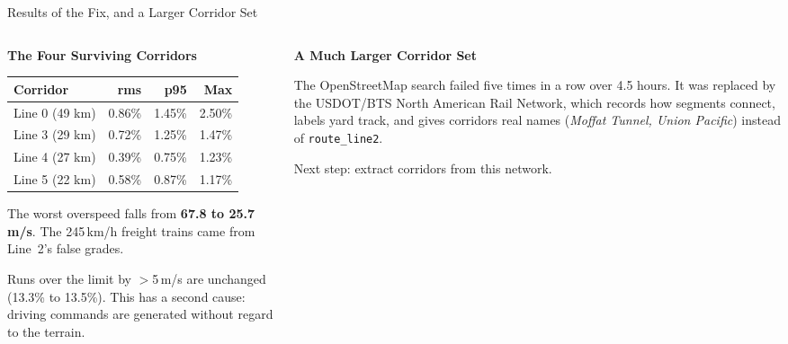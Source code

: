\begin{frame}{Results of the Fix, and a Larger Corridor Set}
  \vspace{0.2em}
  \begin{columns}[T,onlytextwidth]
    \begin{column}{0.46\textwidth}
      {\small\textbf{The Four Surviving Corridors}}
      \vspace{0.4em}

      {\footnotesize
      \begin{tabular}{@{}lrrr@{}}
        \toprule
        \textbf{Corridor} & \textbf{rms} & \textbf{p95} & \textbf{Max} \\
        \midrule
        Line 0 (49 km) & 0.86\% & 1.45\% & 2.50\% \\
        Line 3 (29 km) & 0.72\% & 1.25\% & 1.47\% \\
        Line 4 (27 km) & 0.39\% & 0.75\% & 1.23\% \\
        Line 5 (22 km) & 0.58\% & 0.87\% & 1.17\% \\
        \bottomrule
      \end{tabular}}

      \vspace{0.7em}
      {\footnotesize
      The worst overspeed falls from \textbf{67.8 to 25.7\,m/s}. The 245\,km/h
      freight trains came from Line~2's false grades.

      \vspace{0.4em}
      Runs over the limit by $>$5\,m/s are unchanged (13.3\% to 13.5\%).
      \alert{This has a second cause}: driving commands are generated
      without regard to the terrain.}
    \end{column}
    \begin{column}{0.50\textwidth}
      {\small\textbf{A Much Larger Corridor Set}}
      \vspace{0.5em}

      {\footnotesize The OpenStreetMap search failed five times in a row over
      4.5 hours. It was replaced by the USDOT/BTS North American Rail Network,
      which records how segments connect, labels yard track, and gives
      corridors real names (\emph{Moffat Tunnel, Union Pacific}) instead of
      \texttt{route\_line2}.}

      \vspace{0.6em}
      \begin{center}
      \end{center}

      \vspace{0.4em}
      {\footnotesize Next step: extract corridors from this network.}
    \end{column}
  \end{columns}
\end{frame}
